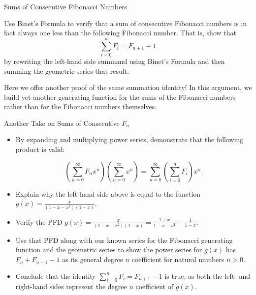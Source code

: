 \begin{exercise}{Sums of Consecutive Fibonacci Numbers \Coffeecup \Coffeecup \Coffeecup}

Use Binet's Formula to verify that a sum of consecutive Fibonacci numbers is in fact always one less than the following Fibonacci number.  That is, show that $$  \sum_{i=0}^n F_i = F_{n+1}-1$$ by rewriting the left-hand side summand using Binet's Formula and then summing the geometric series that result.
\vspace*{3in}
\end{exercise}
Here we offer another proof of the same summation identity!  In this argument, we build yet another generating function for the sums of the Fibonacci numbers rather than for the Fibonacci numbers themselves.
\begin{exercise}{Another Take on Sums of Consecutive $F_n$ \Coffeecup \Coffeecup \Coffeecup}
\begin{itemize}
\item By expanding and multiplying power series, demonstrate that the following product is valid: 

$$   \left(\sum_{n=0}^\infty F_nx^n\right)\left(\sum_{n=0}^\infty x^n\right) = \sum_{n=0}^\infty \left( \sum_{i=0}^n F_i \right)x^n. $$

\vspace*{1in}
\item Explain why the left-hand side above is equal to the
function $g(x)=\frac{x}{\left(1-x-x^2\right)\left(1-x\right)}$.

\vspace*{.5in}

\item Verify the PFD $g(x)=\frac{x}{\left(1-x-x^2\right)\left(1-x\right)}=\frac{1+x}{1-x-x^2}-\frac{1}{1-x}$.

\vspace*{.5in}

\item Use that PFD along with our known series for the Fibonacci generating function and the geometric series to show the power series for $g(x)$ has $F_n+F_{n-1}-1$ as its general degree $n$ coefficient for natural numbers $n>0$. 

\vspace*{1in}

\item Conclude that the identity $  \sum_{i=0}^n F_i = F_{n+1}-1$ is true, as both the left- and right-hand sides represent the degree $n$ coefficient of $g(x)$.

\vspace*{.5in}

\end{itemize}
\end{exercise}
